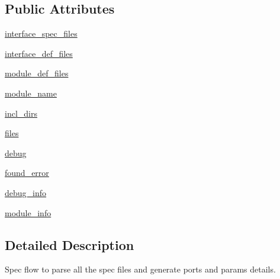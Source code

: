 \subsection*{Public Attributes}
\begin{DoxyCompactItemize}
\item 
\hyperlink{classsrc_1_1spec__flow_1_1spec__flow_ab03fdf31895e01ee5064a6e8c7770cf9}{interface\-\_\-spec\-\_\-files}
\item 
\hyperlink{classsrc_1_1spec__flow_1_1spec__flow_a6aa5ffd58e74b1bc405c03eb1f73685a}{interface\-\_\-def\-\_\-files}
\item 
\hyperlink{classsrc_1_1spec__flow_1_1spec__flow_ad353522556622de20c1ba3cab9437694}{module\-\_\-def\-\_\-files}
\item 
\hyperlink{classsrc_1_1spec__flow_1_1spec__flow_a20bffd81b17afc76d7147c31fb291c17}{module\-\_\-name}
\item 
\hyperlink{classsrc_1_1spec__flow_1_1spec__flow_a463c47bfa286d5b2b7335ac0055ffa21}{incl\-\_\-dirs}
\item 
\hyperlink{classsrc_1_1spec__flow_1_1spec__flow_a5c8040665b1b1bc870f26c389b9a0740}{files}
\item 
\hyperlink{classsrc_1_1spec__flow_1_1spec__flow_ae22e877e0abd24839a8a316275fd03c3}{debug}
\item 
\hyperlink{classsrc_1_1spec__flow_1_1spec__flow_ad84d4e7bcbad46bc04de94a068483821}{found\-\_\-error}
\item 
\hyperlink{classsrc_1_1spec__flow_1_1spec__flow_ae9d1bb1e24e85fc4396c5b58b1367163}{debug\-\_\-info}
\item 
\hyperlink{classsrc_1_1spec__flow_1_1spec__flow_ac0a0b21b31caeac8ad433e7b83a7a4b6}{module\-\_\-info}
\end{DoxyCompactItemize}


\subsection{Detailed Description}
Spec flow to parse all the spec files and generate ports and params details. 

